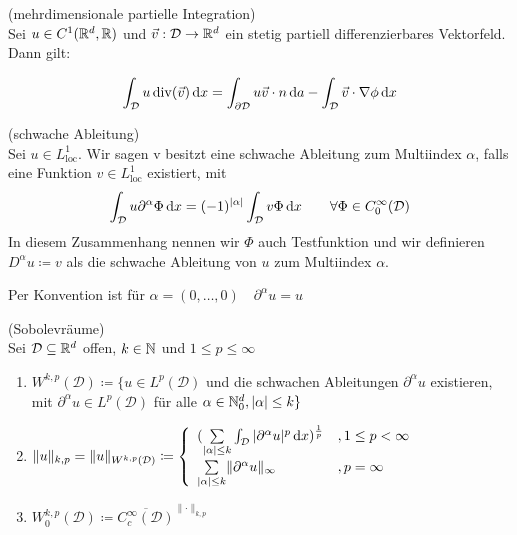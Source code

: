 \begin{Folgerung}(mehrdimensionale partielle Integration) \\
	\label{n_pI}
	Sei $ u \in C^1(\mathbb{R}^d, \mathbb{R})$ und $ \vec v : \mathcal{D} \to \mathbb{R}^d $ ein stetig partiell differenzierbares Vektorfeld.
	Dann gilt:
	
	\begin{align*}
		\int_{\mathcal{D}} u \operatorname{div} ( \vec v) \, \mathrm{d} x = \int_{\partial \mathcal{D}} u \vec v \cdot n \, \mathrm{d} a
		- \int_{\mathcal{D}} \vec v \cdot \nabla \phi \, \mathrm{d} x
	\end{align*}
\end{Folgerung}


\begin{Definition}(schwache Ableitung)\\
	Sei $u \in L_{\text{loc}}^1$. Wir sagen v besitzt eine schwache Ableitung zum Multiindex $\alpha$, falls eine Funktion $v \in L_{\text{loc}}^1$ existiert, mit 
		\begin{align*}
			\int_{\mathcal{D}} u \partial^{\alpha} \Phi \, \mathrm{d} x = (-1)^{|\alpha|} \int_{\mathcal{D}} v \Phi \, \mathrm{d} x \qquad \forall \Phi \in C_0^{\infty}(\mathcal{D})
		\end{align*}
	In diesem Zusammenhang nennen wir $\Phi$ auch Testfunktion und wir definieren $D^{\alpha} u \coloneqq v$ als die schwache Ableitung von $u$ zum Multiindex $\alpha$. 
\end{Definition}
\begin{Bemerkung}
	Per Konvention ist für $ \alpha = (0,\dots, 0) \quad \partial^{\alpha}u = u $
\end{Bemerkung}
\begin{Definition}(Sobolevräume)\\
	Sei $\mathcal{D} \subseteq \mathbb{R}^d $ offen, $ k \in \mathbb{N} $ und $ 1 \leq p \leq \infty $ 
	\begin{enumerate}[label=(\alph*)]
		\item $ W^{k,p} (\mathcal{D}) \coloneqq \{ u \in L^p(\mathcal{D})$ und die schwachen Ableitungen $ \partial^{\alpha}u $ existieren, mit $ \partial^{\alpha}u \in L^p(\mathcal{D}) $ für alle $ \alpha \in \mathbb{N}_0^d , |\alpha| \leq k \} $	
		\item $ \lVert u \rVert_{k,p} =  \lVert u \rVert_{W^{k,p}(\mathcal{D})} \coloneqq 
				\begin{cases}
					\begin{array}{lll}
						(\sum\limits_{|\alpha|\leq k} \int_{\mathcal{D}} |\partial^{\alpha} u |^p \, \mathrm{d} x)^{\frac{1}{p}} &, 1 \leq p < \infty \\
						\sum\limits_{|\alpha|\leq k}   \lVert \partial^{\alpha} u \rVert_{\infty}        &, p = \infty
					\end{array}
				\end{cases}  $
		\item $ W_0^{k,p}(\mathcal{D}) \coloneqq \overline{ C_c^{\infty}(\mathcal{D}) }^{\lVert \cdot \rVert_{k,p}} $
	\end{enumerate}
\end{Definition}

